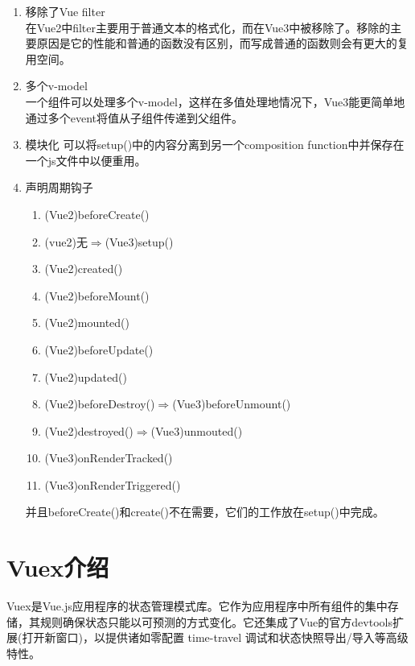 \begin{enumerate}
\begin{enumerate}
          \item 移除了Vue filter\\
                在Vue2中filter主要用于普通文本的格式化，而在Vue3中被移除了。移除的主要原因是它的性能和普通的函数没有区别，而写成普通的函数则会有更大的复用空间。
          \item 多个v-model\\
                一个组件可以处理多个v-model，这样在多值处理地情况下，Vue3能更简单地通过多个event将值从子组件传递到父组件。
          \item 模块化
                可以将setup()中的内容分离到另一个composition function中并保存在一个js文件中以便重用。
          \item 声明周期钩子
                \begin{enumerate}
                  \item (Vue2)beforeCreate()
                  \item (vue2)无$\Rightarrow$(Vue3)setup()
                  \item (Vue2)created()
                  \item (Vue2)beforeMount()
                  \item (Vue2)mounted()
                  \item (Vue2)beforeUpdate()
                  \item (Vue2)updated()
                  \item (Vue2)beforeDestroy()$\Rightarrow$(Vue3)beforeUnmount()
                  \item (Vue2)destroyed()$\Rightarrow$(Vue3)unmouted()
                  \item (Vue3)onRenderTracked()
                  \item (Vue3)onRenderTriggered()
                \end{enumerate}
                并且beforeCreate()和create()不在需要，它们的工作放在setup()中完成。
        \end{enumerate}
\end{enumerate}

\section{Vuex介绍}

Vuex是Vue.js应用程序的状态管理模式库。它作为应用程序中所有组件的集中存储，其规则确保状态只能以可预测的方式变化。它还集成了Vue的官方devtools扩展(打开新窗口)，以提供诸如零配置 time-travel 调试和状态快照导出/导入等高级特性。

